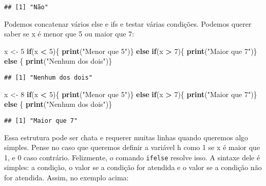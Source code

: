 \documentclass[]{book}
\newenvironment{Shaded}{\begin{snugshade}}{\end{snugshade}}
\newcommand{\KeywordTok}[1]{\textcolor[rgb]{0.13,0.29,0.53}{\textbf{#1}}}
\newcommand{\DecValTok}[1]{\textcolor[rgb]{0.00,0.00,0.81}{#1}}
\newcommand{\StringTok}[1]{\textcolor[rgb]{0.31,0.60,0.02}{#1}}
\newcommand{\ControlFlowTok}[1]{\textcolor[rgb]{0.13,0.29,0.53}{\textbf{#1}}}
\newcommand{\OperatorTok}[1]{\textcolor[rgb]{0.81,0.36,0.00}{\textbf{#1}}}
\newcommand{\NormalTok}[1]{#1}
\begin{document}
\begin{verbatim}
## [1] "Não"
\end{verbatim}

Podemos concatenar vários else e ifs e testar várias condições. Podemos
querer saber se x é menor que 5 ou maior que 7:

\begin{Shaded}
\begin{Highlighting}[]
\NormalTok{x <-}\StringTok{ }\DecValTok{5}
\ControlFlowTok{if}\NormalTok{(x }\OperatorTok{<}\StringTok{ }\DecValTok{5}\NormalTok{)\{}
    \KeywordTok{print}\NormalTok{(}\StringTok{"Menor que 5"}\NormalTok{)\} }\ControlFlowTok{else} \ControlFlowTok{if}\NormalTok{(x }\OperatorTok{>}\StringTok{ }\DecValTok{7}\NormalTok{)\{}
    \KeywordTok{print}\NormalTok{(}\StringTok{"Maior que 7"}\NormalTok{)\} }\ControlFlowTok{else}\NormalTok{ \{}
    \KeywordTok{print}\NormalTok{(}\StringTok{"Nenhum dos dois"}\NormalTok{)\}}
\end{Highlighting}
\end{Shaded}

\begin{verbatim}
## [1] "Nenhum dos dois"
\end{verbatim}

\begin{Shaded}
\begin{Highlighting}[]
\NormalTok{x <-}\StringTok{ }\DecValTok{8}
\ControlFlowTok{if}\NormalTok{(x }\OperatorTok{<}\StringTok{ }\DecValTok{5}\NormalTok{)\{}
    \KeywordTok{print}\NormalTok{(}\StringTok{"Menor que 5"}\NormalTok{)\} }\ControlFlowTok{else} \ControlFlowTok{if}\NormalTok{(x }\OperatorTok{>}\StringTok{ }\DecValTok{7}\NormalTok{)\{}
    \KeywordTok{print}\NormalTok{(}\StringTok{"Maior que 7"}\NormalTok{)\} }\ControlFlowTok{else}\NormalTok{ \{}
    \KeywordTok{print}\NormalTok{(}\StringTok{"Nenhum dos dois"}\NormalTok{)\}}
\end{Highlighting}
\end{Shaded}

\begin{verbatim}
## [1] "Maior que 7"
\end{verbatim}

Essa estrutura pode ser chata e requerer muitas linhas quando queremos
algo simples. Pense no caso que queremos definir a variável h como 1 se
x é maior que 1, e 0 caso contrário. Felizmente, o comando
\texttt{ifelse} resolve isso. A sintaxe dele é simples: a condição, o
valor se a condição for atendida e o valor se a condição não for
atendida. Assim, no exemplo acima:
\end{document}
